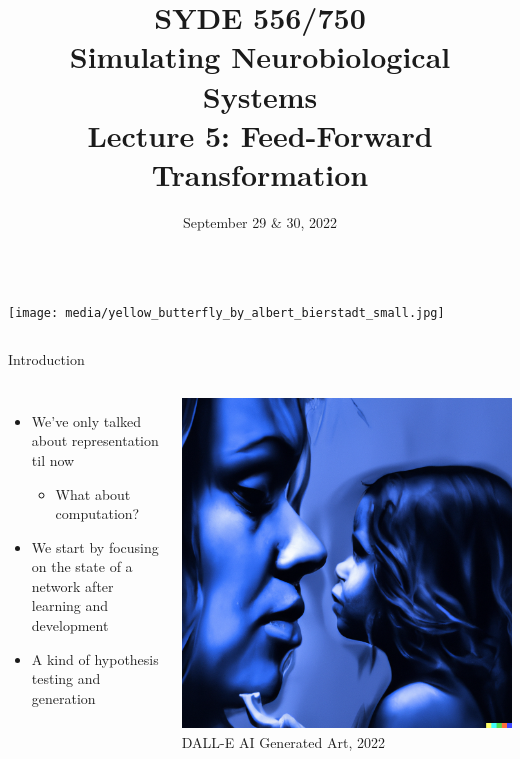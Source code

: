 \documentclass[handout,aspectratio=169]{beamer}
\date{September 29 \& 30, 2022}
\title{SYDE 556/750 \\ Simulating Neurobiological Systems \\ Lecture 5: Feed-Forward Transformation}
\begin{document}
	
	\begin{frame}{}
		\vspace{0.5cm}
		\begin{columns}[c]
			\MakeTitle
			\texttt{[image: media/yellow\_butterfly\_by\_albert\_bierstadt\_small.jpg]}
		\end{columns}
	\end{frame}

	\begin{frame}{Introduction}
    \begin{columns}[c]
        \begin{itemize}
          \setlength\itemsep{0.5cm}
          \item We've only talked about representation til now
          \begin{itemize}
            \setlength\itemsep{0.25cm}
            \item What about computation?
          \end{itemize}
          \item We start by focusing on the state of a network after learning and development
          \item A kind of hypothesis testing and generation 
        \end{itemize}
        \includegraphics[width=\textwidth]{media/dalle_child_adult.png}
        \raggedleft\small DALL-E AI Generated Art, 2022
    \end{columns}
	\end{frame}
\end{document}
